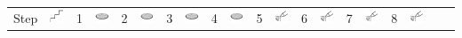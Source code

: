\documentclass{article}
\begin{document}
\thispagestyle{empty}
\begin{table}
\begin{tabular}{|lr|lr|lr|lr|lr|lr|lr|lr|lr|lr|}
\cline{1-20}
Step & \includegraphics[valign=m]{Symbols_SVG/Steps} & 
1 & \includegraphics[valign=m]{Symbols_SVG/Surface_grain} & 
2 & \includegraphics[valign=m]{Symbols_SVG/Surface_grain} & 
3 & \includegraphics[valign=m]{Symbols_SVG/Surface_grain} &
4 & \includegraphics[valign=m]{Symbols_SVG/Surface_grain} & 
5 & \includegraphics[valign=m]{Symbols_SVG/Lubricant_Diamond} & 
6 & \includegraphics[valign=m]{Symbols_SVG/Lubricant_Diamond} &
7 & \includegraphics[valign=m]{Symbols_SVG/Lubricant_Diamond} & 
8 & \includegraphics[valign=m]{Symbols_SVG/Lubricant_Diamond} & 

\end{tabular}
\end{table}
\end{document}
